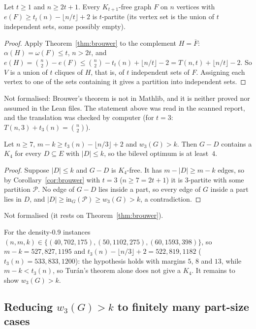 \begin{corollary}\label{cor:brouwer}
Let $t\ge 1$ and $n\ge 2t+1$. Every $K_{t+1}$-free graph $F$ on $n$ vertices with
$e(F)\ge t_t(n)-\lfloor n/t\rfloor+2$ is $t$-partite (its vertex set is the
union of $t$ independent sets, some possibly empty).
\end{corollary}
\begin{proof}
Apply Theorem~\ref{thm:brouwer} to the complement $H=\overline F$:
$\alpha(H)=\omega(F)\le t$, $n>2t$, and
$e(H)=\binom n2-e(F)\le\binom n2-t_t(n)+\lfloor n/t\rfloor-2=T(n,t)+\lfloor n/t\rfloor-2$.
So $V$ is a union of $t$ cliques of $H$, that is, of $t$ independent sets of
$F$. Assigning each vertex to one of the sets containing it gives a partition
into independent sets.
\end{proof}
\noindent Not formalised: Brouwer's theorem is not in Mathlib, and it is
neither proved nor assumed in the Lean files. The statement above was read
in the scanned report, and the translation was checked by computer (for
$t=3$: $T(n,3)+t_3(n)=\binom n2$).

\begin{theorem}\label{thm:clique-lb4}
Let $n\ge 7$, $m-k\ge t_3(n)-\lfloor n/3\rfloor+2$ and $w_3(G)>k$. Then $G-D$
contains a $K_4$ for every $D\subseteq E$ with $|D|\le k$, so the bilevel optimum is
at least~$4$.
\end{theorem}
\begin{proof}
Suppose $|D|\le k$ and $G-D$ is $K_4$-free. It has $m-|D|\ge m-k$ edges, so by
Corollary~\ref{cor:brouwer} with $t=3$ ($n\ge 7=2t+1$) it is 3-partite with some
partition $\mathcal{P}$. No edge of $G-D$ lies inside a part, so every edge of $G$
inside a part lies in $D$, and $|D|\ge\mathrm{in}_G(\mathcal{P})\ge w_3(G)>k$, a
contradiction.
\end{proof}
\noindent Not formalised (it rests on Theorem~\ref{thm:brouwer}).

For the density-0.9 instances $(n,m,k)\in\{(40,702,175),(50,1102,275),(60,1593,398)\}$,
so $m-k=527,827,1195$ and $t_3(n)-\lfloor n/3\rfloor+2=522,819,1182$
($t_3(n)=533,833,1200$): the hypothesis holds with margins $5$, $8$ and $13$,
while $m-k<t_3(n)$, so Tur\'an's theorem alone does not give a $K_4$. It
remains to show $w_3(G)>k$.

\subsection{Reducing $w_3(G)>k$ to finitely many part-size cases}

